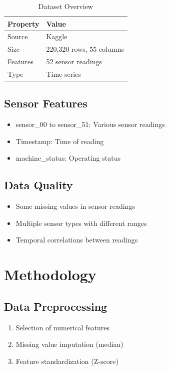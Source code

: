 \documentclass[12pt,a4paper]{report}
\begin{document}
\begin{table}[H]
\centering
\caption{Dataset Overview}
\begin{tabular}{ll}
\toprule
\textbf{Property} & \textbf{Value} \\
\midrule
Source & Kaggle \\
Size & 220,320 rows, 55 columns \\
Features & 52 sensor readings \\
Type & Time-series \\
\bottomrule
\end{tabular}
\end{table}

\section{Sensor Features}
\begin{itemize}
    \item sensor\_00 to sensor\_51: Various sensor readings
    \item Timestamp: Time of reading
    \item machine\_status: Operating status
\end{itemize}

\section{Data Quality}
\begin{itemize}
    \item Some missing values in sensor readings
    \item Multiple sensor types with different ranges
    \item Temporal correlations between readings
\end{itemize}

\chapter{Methodology}

\section{Data Preprocessing}
\begin{enumerate}
    \item Selection of numerical features
    \item Missing value imputation (median)
    \item Feature standardization (Z-score)
\end{enumerate}
\end{document}
